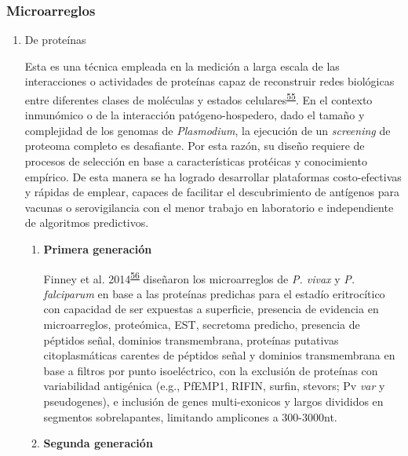 \documentclass[]{article}
\begin{document}
\subsubsection{Microarreglos}\label{microarreglos}

\begin{enumerate}
\def\labelenumi{\alph{enumi}.}
\item
  De proteínas

  Esta es una técnica empleada en la medición a larga escala de las
  interacciones o actividades de proteínas capaz de reconstruir redes
  biológicas entre diferentes clases de moléculas y estados
  celulares\textsuperscript{\protect\hyperlink{ref-uzoma2013interactome}{55}}.
  En el contexto inmunómico o de la interacción patógeno-hospedero, dado
  el tamaño y complejidad de los genomas de \emph{Plasmodium}, la
  ejecución de un \emph{screening} de proteoma completo es desafiante.
  Por esta razón, su diseño requiere de procesos de selección en base a
  características protéicas y conocimiento empírico. De esta manera se
  ha logrado desarrollar plataformas costo-efectivas y rápidas de
  emplear, capaces de facilitar el descubrimiento de antígenos para
  vacunas o serovigilancia con el menor trabajo en laboratorio e
  independiente de algoritmos predictivos.

  \begin{enumerate}
  \def\labelenumii{\roman{enumii}.}
  \item
    \textbf{Primera generación}

    Finney et al.
    2014\textsuperscript{\protect\hyperlink{ref-Finney2014}{56}}
    diseñaron los microarreglos de \emph{P. vivax} y \emph{P.
    falciparum} en base a las proteínas predichas para el estadío
    eritrocítico con capacidad de ser expuestas a superficie, presencia
    de evidencia en microarreglos, proteómica, EST, secretoma predicho,
    presencia de péptidos señal, dominios transmembrana, proteínas
    putativas citoplasmáticas carentes de péptidos señal y dominios
    transmembrana en base a filtros por punto isoeléctrico, con la
    exclusión de proteínas con variabilidad antigénica (e.g., PfEMP1,
    RIFIN, surfin, stevors; Pv \emph{var} y pseudogenes), e inclusión de
    genes multi-exonicos y largos divididos en segmentos sobrelapantes,
    limitando amplicones a 300-3000nt.
  \item
    \textbf{Segunda generación}


\end{enumerate}
\end{enumerate}
\end{document}
